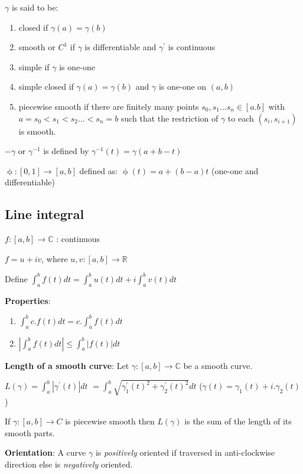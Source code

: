 \documentclass{article}
\begin{document}
\begin{flushleft}
$\gamma$ is said to be:
\begin{enumerate}
    \item closed if $\gamma(a)=\gamma(b)$
    \item smooth or $C^1$ if $\gamma$ is differentiable and $\gamma^{'}$ is continuous
    \item simple if $\gamma$ is one-one
    \item simple closed if $\gamma(a)=\gamma(b)$ and $\gamma$ is one-one on $(a,b)$
    \item piecewise smooth if there are finitely many points $s_0,s_1 \dots s_n\in [a.b]$ with $a=s_0<s_1<s_2 \dots <s_n=b$ such that the restriction of $\gamma$ to each $(s_i,s_{i+1})$ is smooth.

\end{enumerate}

$-\gamma$ or $\gamma^{-1}$ is defined by $\gamma^{-1}(t)=\gamma(a+b-t)$

$\upphi:[0,1]\rightarrow [a,b]$ defined as: $\upphi(t)=a+(b-a)t$ (one-one and differentiable)

\subsection{\textbf{Line integral}} 

$f:[a,b]\rightarrow \mathds{C}$ : continuous

$f=u+iv$, where $u,v:[a,b]\rightarrow \mathds{R}$

Define $\int_{a}^{b}f(t) dt= \int_{a}^{b}u(t) dt+ i \int_{a}^{b} v(t) dt$

\textbf{Properties}:

\begin{enumerate}
    \item $\int_{a}^{b} c.f(t) dt= c.\int_{a}^{b}f(t) dt$
    \item $| \int_{a}^{b}f(t) dt |\leq \int_{a}^{b}|f(t)| dt$
\end{enumerate}
\textbf{Length of a smooth curve}: Let $\gamma:[a,b]\rightarrow \mathds{C}$ be a smooth curve. 

$L(\gamma)= \int_{a}^{b} |\gamma^{'}(t)| dt$
$=\int_{a}^{b} \sqrt{\gamma_1^{'}(t)^2+\gamma_2^{'}(t)^2}  dt$     \: ($\gamma(t)=\gamma_1(t)+i.\gamma_2(t)$)

If $\gamma:[a,b]\rightarrow C$ is piecewise smooth then $L(\gamma)$ is the sum of the length of its smooth parts.

\textbf{Orientation}:  A curve $\gamma$ is \emph{positively} oriented if traversed in anti-clockwise direction else is \emph{negatively} oriented.


\end{flushleft}
\end{document}
